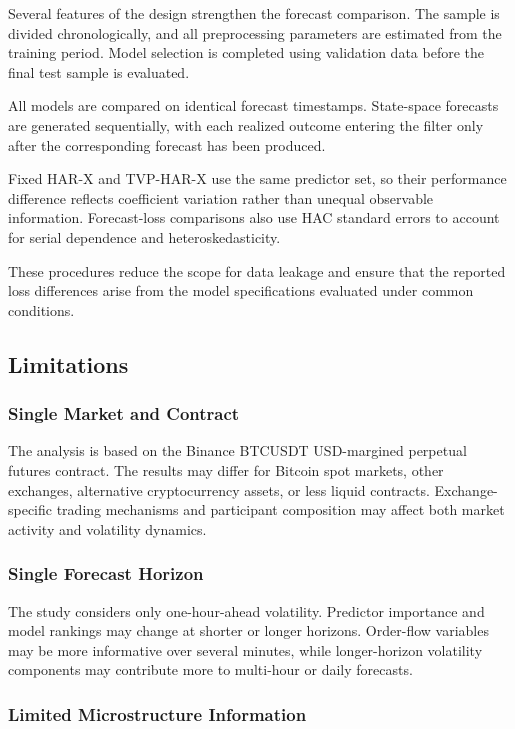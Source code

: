 Several features of the design strengthen the forecast
comparison. The sample is divided chronologically, and all
preprocessing parameters are estimated from the training
period. Model selection is completed using validation data
before the final test sample is evaluated.

All models are compared on identical forecast timestamps.
State-space forecasts are generated sequentially, with each
realized outcome entering the filter only after the
corresponding forecast has been produced.

Fixed HAR-X and TVP-HAR-X use the same predictor set, so their
performance difference reflects coefficient variation rather
than unequal observable information. Forecast-loss comparisons
also use HAC standard errors to account for serial dependence
and heteroskedasticity.

These procedures reduce the scope for data leakage and ensure
that the reported loss differences arise from the model
specifications evaluated under common conditions.

\subsection{Limitations}

\subsubsection{Single Market and Contract}

The analysis is based on the Binance BTCUSDT USD-margined
perpetual futures contract. The results may differ for Bitcoin
spot markets, other exchanges, alternative cryptocurrency
assets, or less liquid contracts. Exchange-specific trading
mechanisms and participant composition may affect both market
activity and volatility dynamics.

\subsubsection{Single Forecast Horizon}

The study considers only one-hour-ahead volatility. Predictor
importance and model rankings may change at shorter or longer
horizons. Order-flow variables may be more informative over
several minutes, while longer-horizon volatility components
may contribute more to multi-hour or daily forecasts.

\subsubsection{Limited Microstructure Information}

